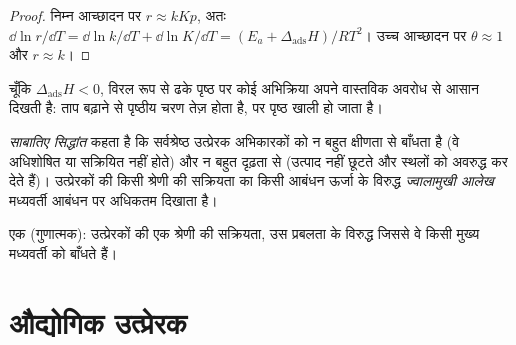 \begin{proof}
निम्न आच्छादन पर $r \approx kKp$, अतः $\dd\ln r/\dd T = \dd\ln k/\dd T + \dd\ln K/\dd T = (E_a + \Delta_{\mathrm{ads}}H)/RT^2$।
उच्च आच्छादन पर $\theta \approx 1$ और $r \approx k$।
\end{proof}

चूँकि $\Delta_{\mathrm{ads}}H < 0$, विरल रूप से ढके पृष्ठ पर कोई अभिक्रिया अपने
वास्तविक अवरोध से आसान दिखती है: ताप बढ़ाने से पृष्ठीय चरण तेज़ होता है, पर
पृष्ठ खाली हो जाता है।

\begin{definition}[साबातिए सिद्धांत, ज्वालामुखी आलेख]\label{def:b3:surfaces-catalysis:sabatier}
\emph{साबातिए सिद्धांत} कहता है कि सर्वश्रेष्ठ
उत्प्रेरक अभिकारकों को न बहुत क्षीणता से बाँधता है (वे अधिशोषित या
सक्रियित नहीं होते) और न बहुत दृढ़ता से (उत्पाद नहीं छूटते और स्थलों को अवरुद्ध कर देते हैं)।
उत्प्रेरकों की किसी श्रेणी की सक्रियता का किसी आबंधन ऊर्जा के विरुद्ध
\emph{ज्वालामुखी आलेख} मध्यवर्ती आबंधन पर अधिकतम दिखाता है।
\end{definition}

\begin{omfigure}

{\small एक  (गुणात्मक): उत्प्रेरकों की एक श्रेणी की सक्रियता,
उस प्रबलता के विरुद्ध जिससे वे किसी मुख्य मध्यवर्ती को बाँधते हैं।}
\end{omfigure}

\section{औद्योगिक उत्प्रेरक}

